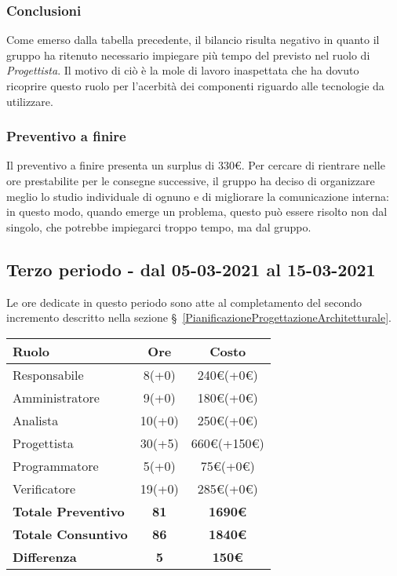 {{{{\subsubsection{Conclusioni}
Come emerso dalla tabella precedente, il bilancio risulta negativo in quanto il gruppo ha ritenuto necessario impiegare più tempo del previsto nel ruolo di \textit{Progettista}. Il motivo di ciò è la mole di lavoro inaspettata che ha dovuto ricoprire questo ruolo per l'acerbità dei componenti riguardo alle tecnologie da utilizzare.

\subsubsection{Preventivo a finire}
Il preventivo a finire presenta un surplus di 330\euro. Per cercare di rientrare nelle ore prestabilite per le consegne successive, il gruppo ha deciso di organizzare meglio lo studio individuale di ognuno e di migliorare la comunicazione interna: in questo modo, quando emerge un problema, questo può essere risolto non dal singolo, che potrebbe impiegarci troppo tempo, ma dal gruppo.

\subsection{Terzo periodo - dal 05-03-2021 al 15-03-2021}\label{ConsuntivoPeriodoDiProgettazioneArchitetturaleTechnologyBaselineTerzoIncremento}

Le ore dedicate in questo periodo sono atte al completamento del secondo incremento descritto nella sezione \S~\ref{PianificazioneProgettazioneArchitetturale}.

\quad
\def\tabularxcolumn#1{m{#1}}
{
	\begin{center}
		\renewcommand{\arraystretch}{1.4}
		\begin{tabularx}{10cm}{|X|c|c|}
			\hline
			\rowcolor{airforceblue}
			\textbf{Ruolo} & \textbf{Ore} & \textbf{Costo}\\
			\hline
			Responsabile & 8(+0) & 240\euro(+0\euro)\\
			\hline
			Amministratore & 9(+0) & 180\euro(+0\euro)\\
			\hline
			Analista & 10(+0) & 250\euro(+0\euro)\\
			\hline
			Progettista & 30(+5) & 660\euro(+150\euro)\\
			\hline
			Programmatore & 5(+0) & 75\euro(+0\euro)\\
			\hline
			Verificatore & 19(+0) & 285\euro(+0\euro)\\
			\hline
			\textbf{Totale Preventivo} & \textbf{81} & \textbf{1690\euro}\\
			\hline
			\textbf{Totale Consuntivo} & \textbf{86} & \textbf{1840\euro}\\
			\hline
			\textbf{Differenza} & \textbf{5} & \textbf{150\euro}
		\end{tabularx}
	\end{center}

}}}}}
